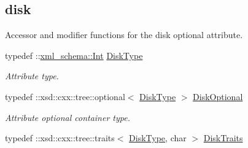 \subsection*{disk}
\label{_amgrp75688b0220ad16c4e02152b6c2b56424}
Accessor and modifier functions for the disk optional attribute. \begin{DoxyCompactItemize}
\item 
\hypertarget{classopenstack_1_1xml_1_1Flavor_aa9b8ffd8f2894beccac051ea147216ea}{
typedef ::\hyperlink{namespacexml__schema_a12d975a13061c938969b2b5143e97645}{xml\_\-schema::Int} \hyperlink{classopenstack_1_1xml_1_1Flavor_aa9b8ffd8f2894beccac051ea147216ea}{DiskType}}
\label{classopenstack_1_1xml_1_1Flavor_aa9b8ffd8f2894beccac051ea147216ea}

\begin{DoxyCompactList}\small\item\em Attribute type. \item\end{DoxyCompactList}\item 
\hypertarget{classopenstack_1_1xml_1_1Flavor_aed467d68d571ae2a8e021bbd79f348b6}{
typedef ::xsd::cxx::tree::optional$<$ \hyperlink{classopenstack_1_1xml_1_1Flavor_aa9b8ffd8f2894beccac051ea147216ea}{DiskType} $>$ \hyperlink{classopenstack_1_1xml_1_1Flavor_aed467d68d571ae2a8e021bbd79f348b6}{DiskOptional}}
\label{classopenstack_1_1xml_1_1Flavor_aed467d68d571ae2a8e021bbd79f348b6}

\begin{DoxyCompactList}\small\item\em Attribute optional container type. \item\end{DoxyCompactList}\item 
\hypertarget{classopenstack_1_1xml_1_1Flavor_a9fd6c7b5b0a24aca16f55f8d12513148}{
typedef ::xsd::cxx::tree::traits$<$ \hyperlink{classopenstack_1_1xml_1_1Flavor_aa9b8ffd8f2894beccac051ea147216ea}{DiskType}, char $>$ \hyperlink{classopenstack_1_1xml_1_1Flavor_a9fd6c7b5b0a24aca16f55f8d12513148}{DiskTraits}}
\label{classopenstack_1_1xml_1_1Flavor_a9fd6c7b5b0a24aca16f55f8d12513148}


\end{DoxyCompactItemize}

